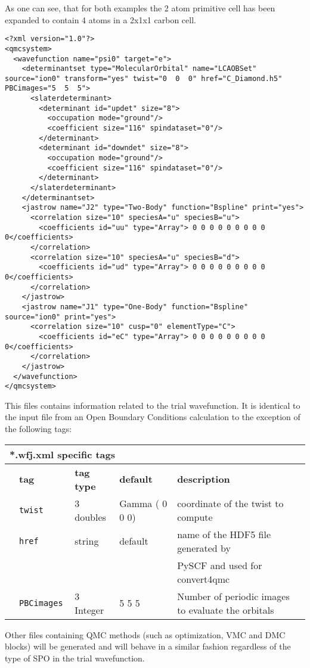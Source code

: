   As one can see, that for both examples the 2 atom primitive cell has been expanded to contain 4 atoms in a 2x1x1 carbon cell.
\begin{lstlisting}[style=XML,caption=CDiamond.wfj-Twist0.xml. This file contains the trial wavefunction.]
<?xml version="1.0"?>
<qmcsystem>
  <wavefunction name="psi0" target="e">
    <determinantset type="MolecularOrbital" name="LCAOBSet" source="ion0" transform="yes" twist="0  0  0" href="C_Diamond.h5" PBCimages="5  5  5">
      <slaterdeterminant>
        <determinant id="updet" size="8">
          <occupation mode="ground"/>
          <coefficient size="116" spindataset="0"/>
        </determinant>
        <determinant id="downdet" size="8">
          <occupation mode="ground"/>
          <coefficient size="116" spindataset="0"/>
        </determinant>
      </slaterdeterminant>
    </determinantset>
    <jastrow name="J2" type="Two-Body" function="Bspline" print="yes">
      <correlation size="10" speciesA="u" speciesB="u">
        <coefficients id="uu" type="Array"> 0 0 0 0 0 0 0 0 0 0</coefficients>
      </correlation>
      <correlation size="10" speciesA="u" speciesB="d">
        <coefficients id="ud" type="Array"> 0 0 0 0 0 0 0 0 0 0</coefficients>
      </correlation>
    </jastrow>
    <jastrow name="J1" type="One-Body" function="Bspline" source="ion0" print="yes">
      <correlation size="10" cusp="0" elementType="C">
        <coefficients id="eC" type="Array"> 0 0 0 0 0 0 0 0 0 0</coefficients>
      </correlation>
    </jastrow>
  </wavefunction>
</qmcsystem>
 \end{lstlisting}
This files contains information related to the trial wavefunction. It is identical to the input file from an Open Boundary Conditions calculation to the exception of the following tags:\\
\begin{table}[h]
\begin{center}
\begin{tabularx}{\textwidth}{l l l l l }
\hline
\multicolumn{5}{l}{*.wfj.xml specific tags} \\
\hline
   &   \bfseries tag     & \bfseries tag type & \bfseries default   & \bfseries description \\
   &   \texttt{twist             } &  3 doubles  & Gamma ( 0 0 0)& coordinate of the twist to compute\\
   &   \texttt{href             } &  string  & default& name of the HDF5 file generated by\\ 
   &                              &          &        &  PySCF and used for convert4qmc\\  
   &   \texttt{PBCimages            } &  3 Integer   & 5 5 5  & Number of periodic images to evaluate the orbitals\\
    \hline
    \end{tabularx}
\end{center}
\end{table}

Other files containing QMC methods (such as optimization, VMC and DMC blocks) will be generated and will behave in a similar fashion regardless of the type of SPO in the trial wavefunction. 




 


